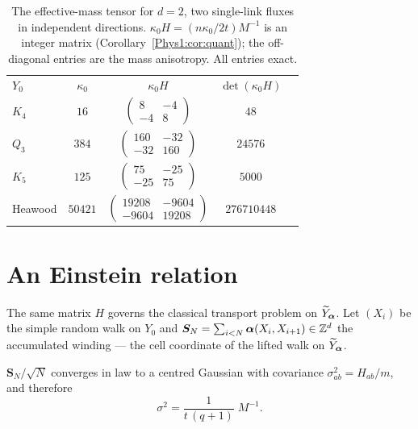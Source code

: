 \begin{table}[t]
\centering
\begin{ruledtabular}
\begin{tabular}{lcccc}
$Y_0$ & $\kappa_0$ & $\kappa_0H$ & $\det(\kappa_0H)$\\
\colrule
$K_4$    & $16$    & $\left(\begin{smallmatrix}8&-4\\-4&8\end{smallmatrix}\right)$ & $48$\\[2pt]
$Q_3$    & $384$   & $\left(\begin{smallmatrix}160&-32\\-32&160\end{smallmatrix}\right)$ & $24576$\\[2pt]
$K_5$    & $125$   & $\left(\begin{smallmatrix}75&-25\\-25&75\end{smallmatrix}\right)$ & $5000$\\[2pt]
Heawood  & $50421$ & $\left(\begin{smallmatrix}19208&-9604\\-9604&19208\end{smallmatrix}\right)$ & $276710448$\\
\end{tabular}
\end{ruledtabular}
\caption{The effective-mass tensor for $d=2$, two single-link fluxes in independent
directions. $\kappa_0H=(n\kappa_0/2t)M^{-1}$ is an integer matrix
(Corollary~\ref{Phys1:cor:quant}); the off-diagonal entries are the mass anisotropy. All entries
exact.}
\label{Phys1:tab:tensor}
\end{table}

\section{An Einstein relation}\label{Phys1:sec:einstein}

The same matrix $H$ governs the classical transport problem on $\widetilde Y_{\bm\alpha}$. Let $(X_i)$ be the
simple random walk on $Y_0$ and $\bm S_N=\sum_{i<N}\bm\alpha(X_i,X_{i+1})\in\mathbb{Z}^{d}$ the
accumulated winding --- the cell coordinate of the lifted walk on $\widetilde Y_{\bm\alpha}$.

\begin{theorem}\label{Phys1:thm:einstein}
$\bm S_N/\sqrt N$ converges in law to a centred Gaussian with covariance
$\sigma^{2}_{ab}=H_{ab}/m$, and therefore
\begin{equation}\label{Phys1:eq:einstein}
\sigma^{2}=\frac{1}{t\,(q{+}1)}\;M^{-1}.
\end{equation}
\end{theorem}

